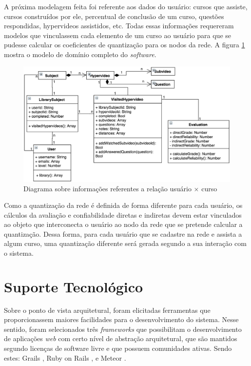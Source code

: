 A próxima modelagem feita foi referente aos dados do usuário: cursos que assiste, cursos construídos por ele, percentual de conclusão de um curso, questões respondidas, hypervideos assistidos, etc. Todas essas informações requereram modelos que vinculassem cada elemento de um curso ao usuário para que se pudesse calcular os coeficientes de quantização para os nodos da rede. A figura \ref{fig:userdata} mostra o modelo de domínio completo do \textit{software}.

\begin{figure}[h!]
	\centering
  	\includegraphics[width=.8\linewidth]{figuras/userdata.eps}
  	\caption{Diagrama sobre informações referentes a relação usuário \(\times\) curso}
  	\label{fig:userdata}
\end{figure}

Como a quantização da rede é definida de forma diferente para cada usuário, os cálculos da avaliação e confiabilidade diretas e indiretas devem estar vinculados ao objeto que interconecta o usuário ao nodo da rede que se pretende calcular a quantização. Dessa forma, para cada usuário que se cadastre na rede e assista a algum curso, uma quantização diferente será gerada segundo a sua interação com o sistema.

\section{Suporte Tecnológico}

Sobre o ponto de vista arquitetural, foram elicitadas ferramentas que proporcionassem maiores facilidades para o desenvolvimento do sistema. Nesse sentido, foram selecionados três \textit{frameworks} que possibilitam o desenvolvimento de aplicações \textit{web} com certo nível de abstração arquitetural, que são mantidos segundo licenças de software livre e que possuem comunidades ativas. Sendo estes: Grails \cite{grails2015}, Ruby on Rails \cite{rubyrails2015}, e Meteor \cite{meteor2015}. 
\\
\\

